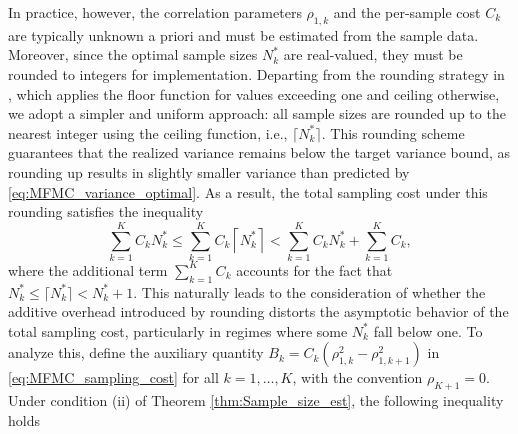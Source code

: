 In practice, however, the correlation parameters $\rho_{1,k}$ and the per-sample cost $C_k$ are typically unknown a priori and must be estimated from the sample data. Moreover, since the optimal sample sizes $N_k^*$ are real-valued, they must be rounded to integers for implementation. Departing from the rounding strategy in \cite{GrGuJuWa:2023, PeWiGu:2016}, which applies the floor function for values exceeding one and ceiling otherwise, we adopt a simpler and uniform approach: all sample sizes are rounded up to the nearest integer using the ceiling function, i.e., $\lceil N_k^* \rceil$. This rounding scheme guarantees that the realized variance remains below the target variance bound, as rounding up results in slightly smaller variance than predicted by \eqref{eq:MFMC_variance_optimal}. As a result, the total sampling cost under this rounding satisfies the inequality
%
\begin{equation}\label{eq:sampling_cost_bound}
    \sum_{k=1}^K C_k N_k^*\le \sum_{k=1}^K C_k \left\lceil N_k^*\right\rceil<\sum_{k=1}^K C_k N_k^* + \sum_{k=1}^K C_k,
\end{equation}
%
where the additional term $\sum_{k=1}^K C_k$ accounts for the fact that $N_k^*\le \lceil N_k^*\rceil< N_k^*+1$. This naturally leads to the consideration of whether the additive overhead introduced by rounding distorts the asymptotic behavior of the total sampling cost, particularly in regimes where some $N_k^*$ fall below one. To analyze this, define the auxiliary quantity $B_k = C_k(\rho_{1,k}^2 - \rho_{1,k+1}^2)$ in \eqref{eq:MFMC_sampling_cost} for all $k=1,\dots, K$, with the convention $\rho_{K+1}=0$. 
%
Under condition (ii) of Theorem \ref{thm:Sample_size_est}, the following inequality holds

